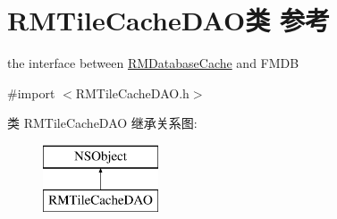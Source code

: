 \hypertarget{interface_r_m_tile_cache_d_a_o}{\section{R\-M\-Tile\-Cache\-D\-A\-O类 参考}
\label{interface_r_m_tile_cache_d_a_o}
}


the interface between \hyperlink{interface_r_m_database_cache}{R\-M\-Database\-Cache} and F\-M\-D\-B  




{\ttfamily \#import $<$R\-M\-Tile\-Cache\-D\-A\-O.\-h$>$}

类 R\-M\-Tile\-Cache\-D\-A\-O 继承关系图\-:\begin{figure}[H]
\begin{center}
\leavevmode
\includegraphics[height=2.000000cm]{interface_r_m_tile_cache_d_a_o}
\end{center}
\end{figure}
